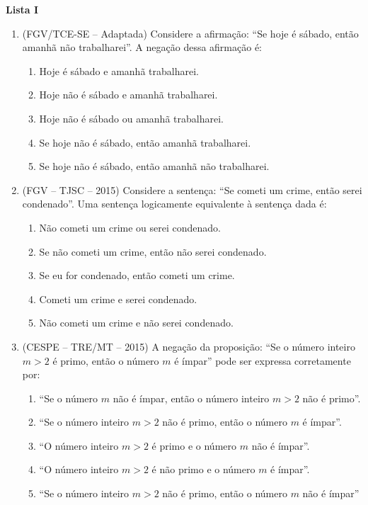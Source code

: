 \documentclass[12pt,a4paper]{article}
\begin{document}
\begin{center}
  \textbf{Lista I}
\end{center}

\begin{enumerate}
  \item (FGV/TCE-SE -- Adaptada) Considere a afirmação: ``Se hoje é sábado, então amanhã não trabalharei''. 
  A negação dessa afirmação é:

    \begin{enumerate}
      \item Hoje é sábado e amanhã trabalharei.
      \item Hoje não é sábado e amanhã trabalharei.
      \item Hoje não é sábado ou amanhã trabalharei.
      \item Se hoje não é sábado, então amanhã trabalharei.
      \item Se hoje não é sábado, então amanhã não trabalharei.
    \end{enumerate}

  \item (FGV – TJSC – 2015) Considere a sentença: ``Se cometi um crime, então
    serei condenado''. Uma sentença logicamente equivalente à sentença dada é:

    \begin{enumerate}
      \item  Não cometi um crime ou serei condenado.
      \item  Se não cometi um crime, então não serei condenado.
      \item  Se eu for condenado, então cometi um crime.
      \item  Cometi um crime e serei condenado.
      \item  Não cometi um crime e não serei condenado.
    \end{enumerate}

  \item (CESPE – TRE/MT – 2015) A negação da proposição: ``Se o número
    inteiro $m > 2$ é primo, então o número $m$ é ímpar'' pode ser expressa
    corretamente por:

    \begin{enumerate}
      \item ``Se o número $m$ não é ímpar, então o número inteiro $m > 2$ não é primo''.
      \item ``Se o número inteiro $m > 2$ não é primo, então o número $m$ é ímpar''.
      \item ``O número inteiro $m > 2$ é primo e o número $m$ não é ímpar''.
      \item ``O número inteiro $m > 2$ é não primo e o número $m$ é ímpar''.
      \item ``Se o número inteiro $m > 2$ não é primo, então o número $m$ não é ímpar''
    \end{enumerate}


\end{enumerate}
\end{document}
